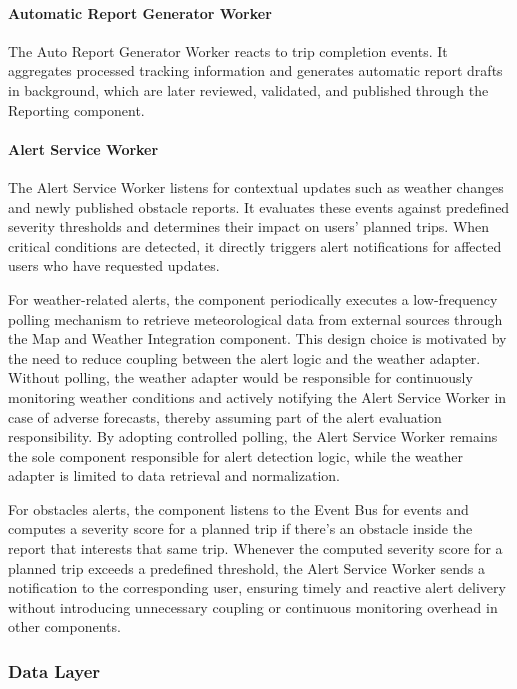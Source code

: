 \paragraph{Automatic Report Generator Worker}
The Auto Report Generator Worker reacts to trip completion events. It aggregates processed tracking information and generates automatic report drafts in background, which are later reviewed, validated, and published through the Reporting component.

\paragraph{Alert Service Worker}
The Alert Service Worker listens for contextual updates such as weather changes and newly published obstacle reports. It evaluates these events against predefined severity thresholds and determines their impact on users’ planned trips. When critical conditions are detected, it directly triggers alert notifications for affected users who have requested updates.

For weather-related alerts, the component periodically executes a low-frequency polling mechanism to retrieve meteorological data from external sources through the Map and Weather Integration component. This design choice is motivated by the need to reduce coupling between the alert logic and the weather adapter. Without polling, the weather adapter would be responsible for continuously monitoring weather conditions and actively notifying the Alert Service Worker in case of adverse forecasts, thereby assuming part of the alert evaluation responsibility. By adopting controlled polling, the Alert Service Worker remains the sole component responsible for alert detection logic, while the weather adapter is limited to data retrieval and normalization.

For obstacles alerts, the component listens to the Event Bus for  events and computes a severity score for a planned trip if there's an obstacle inside the report that interests that same trip. 
Whenever the computed severity score for a planned trip exceeds a predefined threshold, the Alert Service Worker sends a notification to the corresponding user, ensuring timely and reactive alert delivery without introducing unnecessary coupling or continuous monitoring overhead in other components.
 

\subsubsection{Data Layer}
